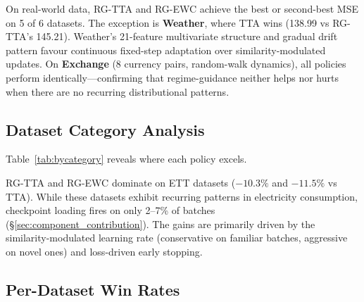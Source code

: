 \documentclass[journal]{IEEEtran}
\begin{document}
On real-world data, RG-TTA and RG-EWC achieve the best or second-best MSE on 5 of 6 datasets. The exception is \textbf{Weather}, where TTA wins (138.99 vs RG-TTA's 145.21). Weather's 21-feature multivariate structure and gradual drift pattern favour continuous fixed-step adaptation over similarity-modulated updates. On \textbf{Exchange} (8 currency pairs, random-walk dynamics), all policies perform identically---confirming that regime-guidance neither helps nor hurts when there are no recurring distributional patterns.

\subsection{Dataset Category Analysis}

Table~\ref{tab:bycategory} reveals where each policy excels.

\begin{table}[t]
\centering
\caption{Average MSE by dataset category and policy, averaged across models and horizons.}
\label{tab:bycategory}
\small
{}%
\end{table}

RG-TTA and RG-EWC dominate on ETT datasets ($-10.3\%$ and $-11.5\%$ vs TTA). While these datasets exhibit recurring patterns in electricity consumption, checkpoint loading fires on only 2--7\% of batches (\S\ref{sec:component_contribution}). The gains are primarily driven by the similarity-modulated learning rate (conservative on familiar batches, aggressive on novel ones) and loss-driven early stopping.

\subsection{Per-Dataset Win Rates}
\end{document}
